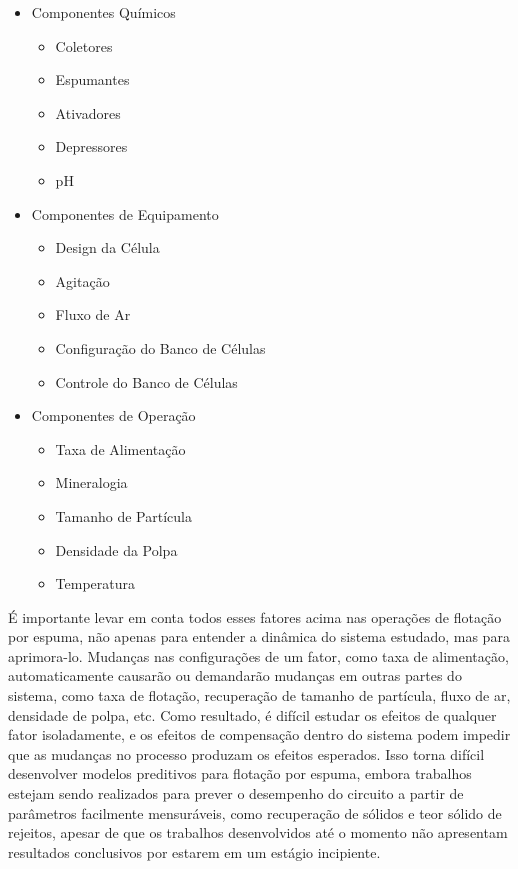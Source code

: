 \documentclass[12pt]{article}
\begin{document}
\begin{itemize}
    \item Componentes Químicos
    \begin{itemize}
        \item Coletores
        \item Espumantes
        \item Ativadores
        \item Depressores
        \item pH
    \end{itemize}
    \item Componentes de Equipamento
    \begin{itemize}
        \item Design da Célula
        \item Agitação
        \item Fluxo de Ar
        \item Configuração do Banco de Células
        \item Controle do Banco de Células
    \end{itemize}
    \item Componentes de Operação
    \begin{itemize}
        \item Taxa de Alimentação
        \item Mineralogia
        \item Tamanho de Partícula
        \item Densidade da Polpa
        \item Temperatura
    \end{itemize}
\end{itemize}


É importante levar em conta todos esses fatores acima nas operações de flotação por espuma, não apenas para entender a dinâmica do sistema estudado, mas para aprimora-lo. Mudanças nas configurações de um fator, como taxa de alimentação, automaticamente causarão ou demandarão mudanças em outras partes do sistema, como taxa de flotação, recuperação de tamanho de partícula, fluxo de ar, densidade de polpa, etc. Como resultado, é difícil estudar os efeitos de qualquer fator isoladamente, e os efeitos de compensação dentro do sistema podem impedir que as mudanças no processo produzam os efeitos esperados. Isso torna difícil desenvolver modelos preditivos para flotação por espuma, embora trabalhos estejam sendo realizados para prever o desempenho do circuito a partir de parâmetros facilmente mensuráveis, como recuperação de sólidos e teor sólido de rejeitos\cite{chen2020lattice,karimi2014cfd,michaux2018challenges}, apesar de que os trabalhos desenvolvidos até o momento não apresentam resultados conclusivos por estarem em um estágio incipiente.
\end{document}
